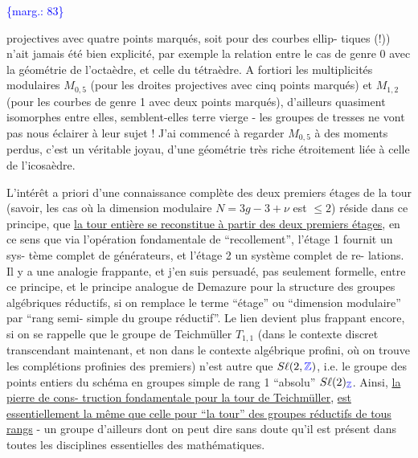\documentclass[11pt]{article}
\newcommand{\scanpage}[1]{\par\bigskip\noindent{\small\sffamily[scan #1]}\par}
\newcommand{\mspage}[1]{{\small\sffamily[p.\,#1]}}
\newcommand{\hand}[1]{\textcolor{blue}{#1}}
\newcommand{\margin}[1]{\textcolor{blue}{\{\textsf{marg.:} #1\}}}
\newcommand{\uline}[1]{\underline{#1}}
\begin{document}
\margin{83}

\clearpage
\scanpage{119/84}
\mspage{6}

projectives avec quatre points marqués, soit pour des courbes ellip-%
tiques (!)) n'ait jamais été bien explicité, par exemple la relation
entre le cas de genre 0 avec la géométrie de l'octaèdre, et celle du
tétraèdre. A fortiori les multiplicités modulaires $M_{0,5}$ (pour les
droites projectives avec cinq points marqués) et $M_{1,2}$ (pour les
courbes de genre 1 avec deux points marqués), d'ailleurs quasiment
isomorphes entre elles, semblent-elles terre vierge - les groupes
de tresses ne vont pas nous éclairer à leur sujet ! J'ai commencé à
regarder $M_{0,5}$ à des moments perdus, c'est un véritable joyau, d'une
géométrie très riche étroitement liée à celle de l'icosaèdre.

L'intérêt a priori d'une connaissance complète des deux
premiers étages de la tour (savoir, les cas où la dimension modulaire
$N = 3g-3+\nu$ est $\leq 2$) réside dans ce principe, que \uline{la tour entière se
reconstitue à partir des deux premiers étages}, en ce sens que via
l'opération fondamentale de ``recollement'', l'étage 1 fournit un sys-%
tème complet de générateurs, et l'étage 2 un système complet de re-%
lations. Il y a une analogie frappante, et j'en suis persuadé, pas
seulement formelle, entre ce principe, et le principe analogue de
Demazure pour la structure des groupes algébriques réductifs, si on
remplace le terme ``étage'' ou ``dimension modulaire'' par ``rang semi-%
simple du groupe réductif''. Le lien devient plus frappant encore,
si on se rappelle que le groupe de Teichmüller $T_{1,1}$ (dans le contexte
discret transcendant maintenant, et non dans le contexte algébrique
profini, où on trouve les complétions profinies des premiers) n'est
autre que $S\ell(2,\hand{\mathbb{Z}})$, i.e. le groupe des points entiers du schéma en
groupes simple de rang 1 ``absolu'' $S\ell(2)_{\hand{\mathbb{Z}}}$. Ainsi, \uline{la pierre de cons-%
truction fondamentale pour la tour de Teichmüller}, \uline{est essentiellement
la même que celle pour ``la tour'' des groupes réductifs de tous rangs} -
un groupe d'ailleurs dont on peut dire sans doute qu'il est présent
dans toutes les disciplines essentielles des mathématiques.
\end{document}

